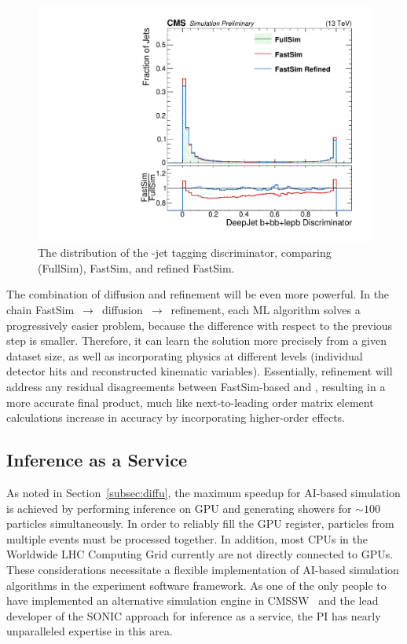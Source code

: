 \begin{figure}[htb!]
\centering
\includegraphics[width=0.5\myfigurewidth]{figures/Regression_20221127_DeepFlavB_preliminary.pdf}
\caption{The distribution of the \DEEPJET \cPqb-jet tagging discriminator, comparing \GEANTfour (FullSim), FastSim, and refined FastSim.}
\label{fig:refine}
\end{figure}

The combination of diffusion and refinement will be even more powerful.
In the chain FastSim~$\to$~diffusion~$\to$~refinement, each ML algorithm solves a progressively easier problem,
because the difference with respect to the previous step is smaller.
Therefore, it can learn the solution more precisely from a given dataset size,
as well as incorporating physics at different levels (individual detector hits and reconstructed kinematic variables).
Essentially, refinement will address any residual disagreements between FastSim-based \diffu and \GEANTfour,
resulting in a more accurate final product, much like next-to-leading order matrix element calculations increase in accuracy by incorporating higher-order effects.

\subsection{Inference as a Service}\label{subsec:iaas}

As noted in Section~\ref{subsec:diffu}, the maximum speedup for AI-based simulation is achieved by performing inference on GPU
and generating showers for ${\sim}100$ particles simultaneously.
In order to reliably fill the GPU register, particles from multiple events must be processed together.
In addition, most CPUs in the Worldwide LHC Computing Grid currently are not directly connected to GPUs.
These considerations necessitate a flexible implementation of AI-based simulation algorithms in the experiment software framework.
As one of the only people to have implemented an alternative simulation engine in CMSSW~\cite{Pedro:2020kbk}
and the lead developer of the SONIC approach for inference as a service,
the PI has nearly unparalleled expertise in this area.

